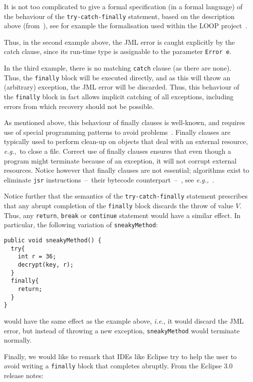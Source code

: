\documentclass[]{llncs}
\begin{document}
It is not too complicated to give a formal specification (in a formal
language) of the behaviour of the \texttt{try-catch-finally}
statement, based on the description above (from~\cite{GoslingJSB05}),
see for example the formalisation used within the LOOP
project~\cite{Jacobs01}.

Thus, in the second example above, the JML error is caught explicitly
by the catch clause, since its run-time type is assignable to the
parameter \texttt{Error e}.

In the third example, there is no matching \texttt{catch} clause (as
there are none). Thus, the \texttt{finally} block will be executed
directly, and as this will throw an (arbitrary) exception, the JML
error will be discarded. Thus, this behaviour of the \texttt{finally}
block in fact allows implicit catching of all exceptions, including
errors from which recovery should not be possible.

As mentioned above, this behaviour of finally clauses is well-known, and
requires use of special programming patterns to avoid
problems~\cite{Eckel02,Jenkov-online}. Finally clauses are typically
used to perform clean-up on objects that deal with an external
resource, \emph{e.g.},\ to close a file. Correct use of finally
clauses ensures that even though a program might terminate because of
an exception, it will not corrupt external resources. Notice however
that finally clauses are not essential; algorithms exist to eliminate
\texttt{jsr} instructions~--~their bytecode counterpart~--~, see
\emph{e.g.,}~\cite{ArthoB05}.

Notice further that the semantics of the \texttt{try-catch-finally}
statement prescribes that any abrupt completion of the
\texttt{finally} block discards the throw of value \(V\). Thus, any
\texttt{return}, \texttt{break} or \texttt{continue} statement would
have a similar effect. In particular, the following variation of
\texttt{sneakyMethod}: 
\begin{verbatim}
public void sneakyMethod() {
  try{ 
    int r = 36; 
    decrypt(key, r);                                           
  }           
  finally{
    return;
  }
}
\end{verbatim}
would have the same effect as the example above, \emph{i.e.}, it would
discard the JML error, but instead of throwing a new exception,
\texttt{sneakyMethod} would terminate normally.

Finally, we would like to remark that IDEs like Eclipse try to help
the user to avoid writing a \texttt{finally} block that completes
abruptly. From the Eclipse 3.0 release notes:
\end{document}
